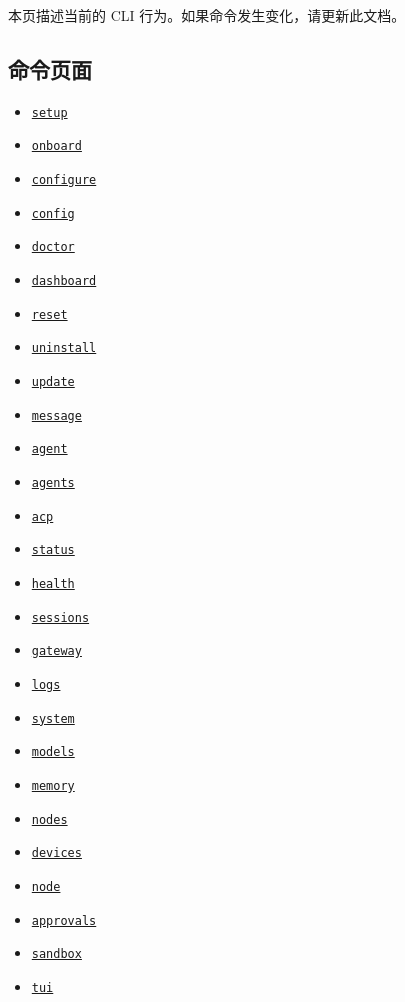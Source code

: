 本页描述当前的 CLI 行为。如果命令发生变化，请更新此文档。

\subsection{命令页面}


\begin{itemize}
  \item \href{/cli/setup}{\texttt{setup}}
  \item \href{/cli/onboard}{\texttt{onboard}}
  \item \href{/cli/configure}{\texttt{configure}}
  \item \href{/cli/config}{\texttt{config}}
  \item \href{/cli/doctor}{\texttt{doctor}}
  \item \href{/cli/dashboard}{\texttt{dashboard}}
  \item \href{/cli/reset}{\texttt{reset}}
  \item \href{/cli/uninstall}{\texttt{uninstall}}
  \item \href{/cli/update}{\texttt{update}}
  \item \href{/cli/message}{\texttt{message}}
  \item \href{/cli/agent}{\texttt{agent}}
  \item \href{/cli/agents}{\texttt{agents}}
  \item \href{/cli/acp}{\texttt{acp}}
  \item \href{/cli/status}{\texttt{status}}
  \item \href{/cli/health}{\texttt{health}}
  \item \href{/cli/sessions}{\texttt{sessions}}
  \item \href{/cli/gateway}{\texttt{gateway}}
  \item \href{/cli/logs}{\texttt{logs}}
  \item \href{/cli/system}{\texttt{system}}
  \item \href{/cli/models}{\texttt{models}}
  \item \href{/cli/memory}{\texttt{memory}}
  \item \href{/cli/nodes}{\texttt{nodes}}
  \item \href{/cli/devices}{\texttt{devices}}
  \item \href{/cli/node}{\texttt{node}}
  \item \href{/cli/approvals}{\texttt{approvals}}
  \item \href{/cli/sandbox}{\texttt{sandbox}}
  \item \href{/cli/tui}{\texttt{tui}}

\end{itemize}
